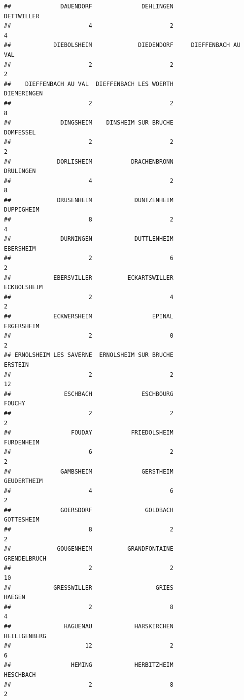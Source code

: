 \documentclass{article}\usepackage[]{graphicx}\usepackage[]{color}
\makeatletter
\newenvironment{kframe}{%
 \def\at@end@of@kframe{}%
 \ifinner\ifhmode%
  \def\at@end@of@kframe{\end{minipage}}%
  \begin{minipage}{\columnwidth}%
 \fi\fi%
 \def\FrameCommand##1{\hskip\@totalleftmargin \hskip-\fboxsep
 \colorbox{shadecolor}{##1}\hskip-\fboxsep
     \hskip-\linewidth \hskip-\@totalleftmargin \hskip\columnwidth}%
 \MakeFramed {\advance\hsize-\width
   \@totalleftmargin\z@ \linewidth\hsize
   \@setminipage}}%
 {\par\unskip\endMakeFramed%
 \at@end@of@kframe}
\newenvironment{knitrout}{}{} %
\makeatother
\begin{document}
\begin{knitrout}
\begin{kframe}
\begin{verbatim}
##              DAUENDORF              DEHLINGEN             DETTWILLER 
##                      4                      2                      4 
##            DIEBOLSHEIM             DIEDENDORF     DIEFFENBACH AU VAL 
##                      2                      2                      2 
##    DIEFFENBACH AU VAL  DIEFFENBACH LES WOERTH            DIEMERINGEN 
##                      2                      2                      8 
##              DINGSHEIM    DINSHEIM SUR BRUCHE              DOMFESSEL 
##                      2                      2                      2 
##             DORLISHEIM           DRACHENBRONN              DRULINGEN 
##                      4                      2                      8 
##             DRUSENHEIM            DUNTZENHEIM             DUPPIGHEIM 
##                      8                      2                      4 
##              DURNINGEN            DUTTLENHEIM              EBERSHEIM 
##                      2                      6                      2 
##            EBERSVILLER          ECKARTSWILLER            ECKBOLSHEIM 
##                      2                      4                      2 
##            ECKWERSHEIM                 EPINAL             ERGERSHEIM 
##                      2                      0                      2 
## ERNOLSHEIM LES SAVERNE  ERNOLSHEIM SUR BRUCHE                ERSTEIN 
##                      2                      2                     12 
##               ESCHBACH              ESCHBOURG                 FOUCHY 
##                      2                      2                      2 
##                 FOUDAY           FRIEDOLSHEIM             FURDENHEIM 
##                      6                      2                      2 
##              GAMBSHEIM              GERSTHEIM            GEUDERTHEIM 
##                      4                      6                      2 
##              GOERSDORF               GOLDBACH             GOTTESHEIM 
##                      8                      2                      2 
##             GOUGENHEIM          GRANDFONTAINE           GRENDELBRUCH 
##                      2                      2                     10 
##            GRESSWILLER                  GRIES                 HAEGEN 
##                      2                      8                      4 
##               HAGUENAU            HARSKIRCHEN           HEILIGENBERG 
##                     12                      2                      6 
##                 HEMING            HERBITZHEIM              HESCHBACH 
##                      2                      8                      2 

\end{verbatim}
\end{kframe}
\end{knitrout}
\end{document}
